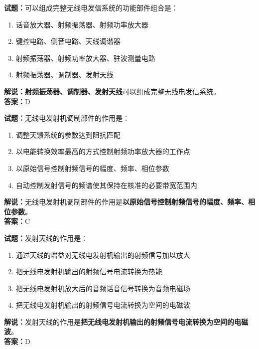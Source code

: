 \documentclass{ctexbook}
\begin{document}
\bigskip


\noindent\textbf{试题：}可以组成完整无线电发信系统的功能部件组合是：

\begin{enumerate}[leftmargin=3em]
	\item 话音放大器、射频振荡器、射频功率放大器
	\item 键控电路、侧音电路、天线调谐器
	\item 射频振荡器、射频功率放大器、驻波测量电路
	\item 射频振荡器、调制器、发射天线
\end{enumerate}

\noindent\textbf{解说：}\textbf{射频振荡器、调制器、发射天线}可以组成完整无线电发信系统。\\\noindent\textbf{答案：}D%


\bigskip


\noindent\textbf{试题：}无线电发射机调制部件的作用是：

\begin{enumerate}[leftmargin=3em]
	\item 调整天馈系统的参数达到阻抗匹配
	\item 以电能转换效率最高的方式控制射频功率放大器的工作点
	\item 以原始信号控制射频信号的幅度、频率、相位参数
	\item 自动控制发射信号的频谱使其保持在核准的必要带宽范围内
\end{enumerate}

\noindent\textbf{解说：}无线电发射机调制部件的作用是\textbf{以原始信号控制射频信号的幅度、频率、相位参数}。\\\noindent\textbf{答案：}C%


\bigskip


\noindent\textbf{试题：}发射天线的作用是：

\begin{enumerate}[leftmargin=3em]
	\item 通过天线的增益对无线电发射机输出的射频信号加以放大
	\item 把无线电发射机输出的射频信号电流转换为热能
	\item 把无线电发射机放大后的音频话音信号转换为音频电磁场
	\item 把无线电发射机输出的射频信号电流转换为空间的电磁波
\end{enumerate}

\noindent\textbf{解说：}发射天线的作用是\textbf{把无线电发射机输出的射频信号电流转换为空间的电磁波}。\\\noindent\textbf{答案：}D%
\end{document}
